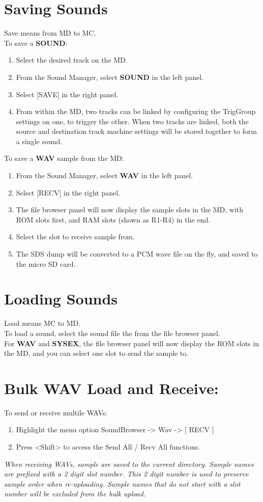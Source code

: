 \section{Saving Sounds}
Save means from MD to MC.\\
To save a \textbf{SOUND}:
\begin{enumerate}
 \item Select the desired track on the MD.
 \item From the Sound Manager, select \textbf{SOUND} in the left panel.
 \item Select [SAVE] in the right panel.
 \item From within the MD, two tracks can be linked by configuring the TrigGroup settings on one, to trigger the other. When two tracks are linked, both the source and destination track machine settings will be stored together to form a single sound.
\end{enumerate}
To save a \textbf{WAV} sample from the MD:
\begin{enumerate}
    \item From the Sound Manager, select \textbf{WAV} in the left panel.
    \item Select [RECV] in the right panel.
    \item The file browser panel will now display the sample slots in the MD, with ROM slots first, and RAM slots (shown as R1-R4) in the end.
    \item Select the slot to receive sample from.
    \item The SDS dump will be converted to a PCM wave file on the fly, and saved to the micro SD card.
\end{enumerate}

\section{Loading Sounds}
Load means MC to MD.\\
To load a sound, select the sound file the from the file browser panel.\\
For \textbf{WAV} and \textbf{SYSEX}, the file browser panel will now display the ROM slots in the MD, and you can select one slot to send the sample to.
\\
\section{Bulk WAV Load and Receive:}
To send or receive multile WAVs:
\begin{enumerate}
\item Highlight the menu option SoundBrowser -> Wav -> [ RECV ]
\item Press <Shift> to access the Send All / Recv All functions.\\
\end{enumerate}
\textit{When receiving WAVs, sample are saved to the current directory. Sample names are prefixed with a 2 digit slot number. This 2 digit number is used to preserve sample order when re-uploading. Sample names that do not start with a slot number will be excluded from the bulk upload.}
\newpage
